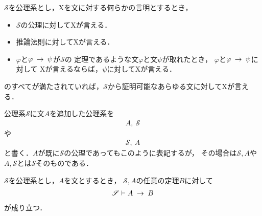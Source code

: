 	\begin{screen}
		\begin{metaaxm}[証明に対する構造的帰納法]
			$\mathscr{S}$を公理系とし，Xを文に対する何らかの言明とするとき，
			\begin{itemize}
				\item $\mathscr{S}$の公理に対してXが言える．
				\item 推論法則に対してXが言える．
				\item $\varphi$と$\varphi \hspace{0.25em}\rightarrow\hspace{0.25em} \psi$が$\mathscr{S}$の
					定理であるような文$\varphi$と文$\psi$が取れたとき，
					$\varphi$と$\varphi \hspace{0.25em}\rightarrow\hspace{0.25em} \psi$に対して
					Xが言えるならば，$\psi$に対してXが言える．
			\end{itemize}
			のすべてが満たされていれば，$\mathscr{S}$から証明可能なあらゆる文に対してXが言える．
		\end{metaaxm}
	\end{screen}
	
	公理系$\mathscr{S}$に文$A$を追加した公理系を
	\begin{align}
		A,\ \mathscr{S}
	\end{align}
	や
	\begin{align}
		\mathscr{S},\ A
	\end{align}
	と書く．$A$が既に$\mathscr{S}$の公理であってもこのように表記するが，
	その場合は$\mathscr{S}, A$や$A,\mathscr{S}$とは$\mathscr{S}$そのものである．
	
	\begin{screen}
		\begin{metathm}[演繹法則]\label{metathm:deduction_theorem}
			$\mathscr{S}$を公理系とし，$A$を文とするとき，
			$\mathscr{S}, A$の任意の定理$B$に対して
			\begin{align}
				\mathscr{S} \vdash A \hspace{0.25em}\rightarrow\hspace{0.25em} B
			\end{align}
			が成り立つ．
		\end{metathm}
	\end{screen}
	
